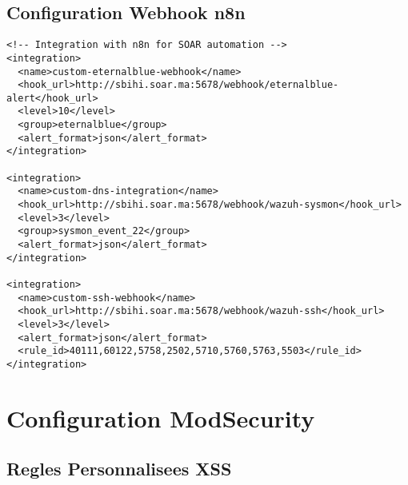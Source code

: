 \subsection{Configuration Webhook n8n}

\begin{lstlisting}[style=xmlstyle,caption=Configuration Webhook Wazuh vers n8n]
<!-- Integration with n8n for SOAR automation -->
<integration>
  <name>custom-eternalblue-webhook</name>
  <hook_url>http://sbihi.soar.ma:5678/webhook/eternalblue-alert</hook_url>
  <level>10</level>
  <group>eternalblue</group>
  <alert_format>json</alert_format>
</integration>

<integration>
  <name>custom-dns-integration</name>
  <hook_url>http://sbihi.soar.ma:5678/webhook/wazuh-sysmon</hook_url>
  <level>3</level>
  <group>sysmon_event_22</group>
  <alert_format>json</alert_format>
</integration>

<integration>
  <name>custom-ssh-webhook</name>
  <hook_url>http://sbihi.soar.ma:5678/webhook/wazuh-ssh</hook_url>
  <level>3</level>
  <alert_format>json</alert_format>
  <rule_id>40111,60122,5758,2502,5710,5760,5763,5503</rule_id>
</integration>
\end{lstlisting}

\section{Configuration ModSecurity}

\subsection{Regles Personnalisees XSS}

